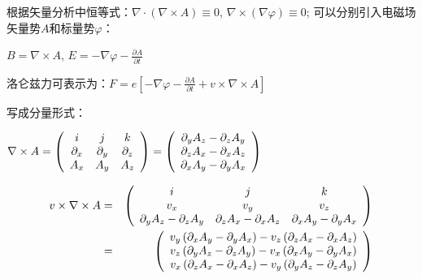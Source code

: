 根据矢量分析中恒等式：$\nabla  \cdot \left( {\nabla  \times A} \right) \equiv 0$, $\nabla  \times \left( {\nabla \varphi } \right) \equiv 0$; 可以分别引入电磁场矢量势$A$和标量势$\varphi$：

\begin{center}
$B = \nabla  \times A$, $E =  - \nabla \varphi  - \frac{{\partial A}}{{\partial t}}$
\end{center}

洛仑兹力可表示为：$F = e\left[ { - \nabla \varphi  - \frac{{\partial A}}{{\partial t}} + v \times \nabla  \times A} \right]$

写成分量形式：

$\nabla  \times A = \left( {\begin{array}{*{20}c}
   i & j & k  \\
   {\partial _x } & {\partial _y } & {\partial _z }  \\
   {A_x } & {A_y } & {A_z }  \\
\end{array}} \right) = \left( {\begin{array}{*{20}c}
   {\partial _y A_z  - \partial _z A_y }  \\
   {\partial _z A_x  - \partial _x A_z }  \\
   {\partial _x A_y  - \partial _y A_x }  \\
\end{array}} \right)$

\begin{eqnarray*}
 v \times \nabla  \times A & = & \left( {\begin{array}{*{20}c}
   i & j & k  \\
   {v_x } & {v_y } & {v_z }  \\
   {\partial _y A_z  - \partial _z A_y } & {\partial _z A_x  - \partial _x A_z } & {\partial _x A_y  - \partial _y A_x }  \\
\end{array}} \right) \\
{} & = & \left( {\begin{array}{*{20}c}
   {v_y \left( {\partial _x A_y  - \partial _y A_x } \right) - v_z \left( {\partial _z A_x  - \partial _x A_z } \right)}  \\
   {v_z \left( {\partial _y A_z  - \partial _z A_y } \right) - v_x \left( {\partial _x A_y  - \partial _y A_x } \right)}  \\
   {v_x \left( {\partial _z A_x  - \partial _x A_z } \right) - v_y \left( {\partial _y A_z  - \partial _z A_y } \right)}  \\
\end{array}} \right) 
\end{eqnarray*}



